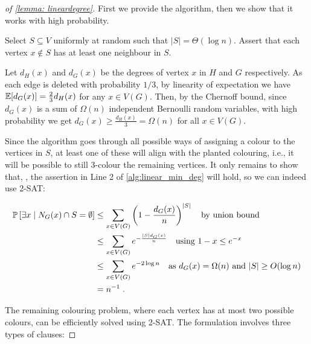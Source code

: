 \begin{proof}[of \cref{lemma: lineardegree}]
    
First we provide the algorithm, then we show that it works with high probability.

\begin{algorithm}[H]
    \caption{Linear Minimum Degree Recovery}
    \label{alg:linear_min_deg}
    \DontPrintSemicolon
    Select $S \subseteq V$ uniformly at random such that $|S| = \Theta(\log{n})$.\;
    Assert that each vertex $x \notin S$ has at least one neighbour in $S$.\;
\end{algorithm}


Let $d_H(x)$ and $d_G(x)$ be the degrees of vertex $x$ in $H$ and $G$ respectively. As each edge is deleted with probability $1/3$, by linearity of expectation we have $\operatorname*{\mathbb{E}}[d_G(x)] = \frac{2}{3}d_H(x)$ for any $x \in V(G)$. Then, by the Chernoff bound, since $d_G(x)$ is a sum of $\Omega(n)$ independent Bernoulli random variables, with high probability we get $d_G(x) \geq \frac{d_H(x)}{3}=\Omega(n)$ for all $x \in V(G)$.

Since the algorithm goes through all possible ways of assigning a colour to the vertices in $S$, at least one of these will align with the planted colouring, i.e., it will be possible to still $3$-colour the remaining vertices. It only remains to show that, \whp, the assertion in Line 2 of \cref{alg:linear_min_deg} will hold, so we can indeed use 2-SAT:

\begin{align*}
    \mathbb{P}\left[\exists x\;|\;N_G(x)\cap S=\emptyset\right]&\leq \sum_{x\in V(G)} \left(1-\frac{d_G(x)}{n}\right)^{\left\lvert S\right\rvert} \quad\text{by union bound}\\
    &\leq \sum_{x\in V(G)} e^{-\frac{\left\lvert S\right\rvert d_G(x)}{n}} \quad\text{using $1-x \leq e^{-x}$}\\
    &\leq \sum_{x\in V(G)} e^{-2\log{n}} \quad\text{as $d_G(x) = \Omega(n)$ and $\left\lvert S\right\rvert\geq O(\log{n})$}\\
    &= n^{-1}\;.
\end{align*}

The remaining colouring problem, where each vertex has at most two possible colours, can be efficiently solved using 2-SAT. The formulation involves three types of clauses:


\end{proof}
